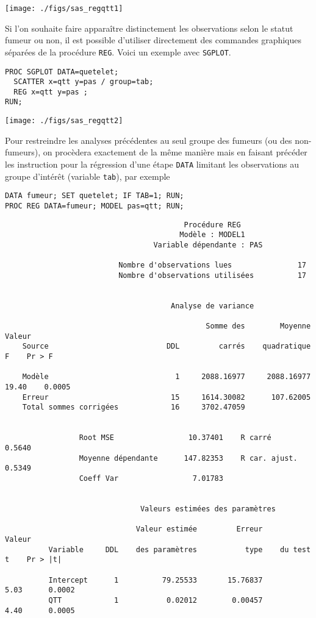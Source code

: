 \texttt{[image: ./figs/sas\_regqtt1]}

Si l'on souhaite faire apparaître distinctement les observations selon le statut fumeur ou non, il est possible d'utiliser directement des commandes graphiques séparées de la procédure \texttt{REG}. Voici un exemple avec \texttt{SGPLOT}.
\begin{verbatim}
PROC SGPLOT DATA=quetelet;
  SCATTER x=qtt y=pas / group=tab;
  REG x=qtt y=pas ;
RUN;
\end{verbatim}

\texttt{[image: ./figs/sas\_regqtt2]}

Pour restreindre les analyses précédentes au seul groupe des fumeurs (ou des
non-fumeurs), on procèdera exactement de la même manière mais en faisant
précéder les instruction \SAS pour la régression d'une étape \texttt{DATA}
limitant les observations au groupe d'intérêt (variable \texttt{tab}), par
exemple
\begin{verbatim}
DATA fumeur; SET quetelet; IF TAB=1; RUN;
PROC REG DATA=fumeur; MODEL pas=qtt; RUN;
\end{verbatim}

\begin{verbatim}
                                         Procédure REG
                                        Modèle : MODEL1
                                  Variable dépendante : PAS

                          Nombre d'observations lues               17
                          Nombre d'observations utilisées          17


                                      Analyse de variance

                                              Somme des        Moyenne     Valeur
    Source                           DDL         carrés    quadratique          F    Pr > F

    Modèle                             1     2088.16977     2088.16977      19.40    0.0005
    Erreur                            15     1614.30082      107.62005
    Total sommes corrigées            16     3702.47059


                 Root MSE                 10.37401    R carré           0.5640
                 Moyenne dépendante      147.82353    R car. ajust.     0.5349
                 Coeff Var                 7.01783


                               Valeurs estimées des paramètres

                              Valeur estimée         Erreur       Valeur
          Variable     DDL    des paramètres           type    du test t    Pr > |t|

          Intercept      1          79.25533       15.76837         5.03      0.0002
          QTT            1           0.02012        0.00457         4.40      0.0005
\end{verbatim}

